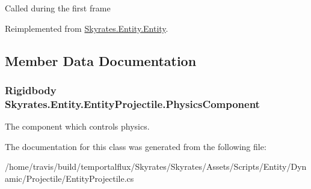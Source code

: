 Called during the first frame 



Reimplemented from \hyperlink{class_skyrates_1_1_entity_1_1_entity_a014d40273b5d21520736b76ba9aaca92}{Skyrates.\-Entity.\-Entity}.



\subsection{Member Data Documentation}
\hypertarget{class_skyrates_1_1_entity_1_1_entity_projectile_a8882ddff06e010914232b464f916704a}{
\subsubsection[{Physics\-Component}]{\setlength{\rightskip}{0pt plus 5cm}Rigidbody Skyrates.\-Entity.\-Entity\-Projectile.\-Physics\-Component}}\label{class_skyrates_1_1_entity_1_1_entity_projectile_a8882ddff06e010914232b464f916704a}


The component which controls physics. 



The documentation for this class was generated from the following file\-:\begin{DoxyCompactItemize}
\item 
/home/travis/build/temportalflux/\-Skyrates/\-Skyrates/\-Assets/\-Scripts/\-Entity/\-Dynamic/\-Projectile/Entity\-Projectile.\-cs\end{DoxyCompactItemize}

